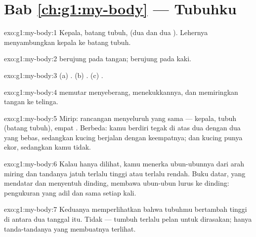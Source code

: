 \section*{Bab \ref{ch:g1:my-body} --- Tubuhku}

\begin{solution}{exo:g1:my-body:1}
Kepala, batang tubuh,  (dua  dan dua ).
Lehernya menyambungkan kepala ke batang tubuh.
\end{solution}

\begin{solution}{exo:g1:my-body:2}
 berujung pada tangan;  berujung pada kaki.
\end{solution}

\begin{solution}{exo:g1:my-body:3}
(a) . (b) . (c) .
\end{solution}

\begin{solution}{exo:g1:my-body:4}
 memutar  menyeberang,  menekukkannya, dan
 memiringkan tangan ke telinga.
\end{solution}

\begin{solution}{exo:g1:my-body:5}
Mirip: rancangan menyeluruh yang sama --- kepala, tubuh (batang
tubuh), empat . Berbeda: kamu berdiri tegak di atas dua
 dengan dua  yang bebas, sedangkan kucing berjalan dengan
keempatnya; dan kucing punya ekor, sedangkan kamu tidak.
\end{solution}

\begin{solution}{exo:g1:my-body:6}
Kalau hanya dilihat, kamu menerka ubun-ubunnya dari arah miring dan
tandanya jatuh terlalu tinggi atau terlalu rendah. Buku datar, yang
mendatar dan menyentuh dinding, membawa ubun-ubun lurus ke dinding:
pengukuran yang adil dan sama setiap kali.
\end{solution}

\begin{solution}{exo:g1:my-body:7}
Keduanya memperlihatkan bahwa tubuhmu bertambah tinggi di antara dua
tanggal itu. Tidak --- tumbuh terlalu pelan untuk dirasakan; hanya
tanda-tandanya yang membuatnya terlihat.
\end{solution}

